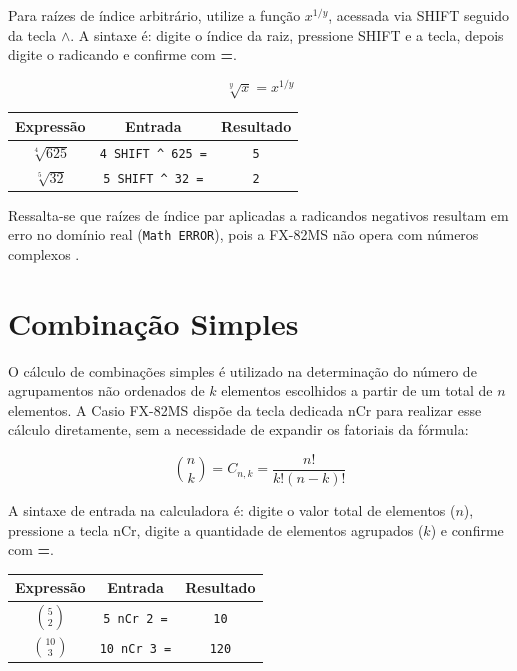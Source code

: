 Para raízes de índice arbitrário, utilize a função \textbf{$x^{1/y}$}, acessada via SHIFT seguido da tecla \textbf{$\wedge$}. A sintaxe é: digite o índice da raiz, pressione SHIFT e a tecla, depois digite o radicando e confirme com \textbf{=}.

\[
    \sqrt[y]{x} = x^{1/y}
\]

\begin{center}
\begin{tabular}{|c|c|c|}
    \hline
    \textbf{Expressão} & \textbf{Entrada} & \textbf{Resultado} \\
    \hline
    $\sqrt[4]{625}$ & \texttt{4 SHIFT \^{} 625 =} & \texttt{5} \\
    $\sqrt[5]{32}$ & \texttt{5 SHIFT \^{} 32 =} & \texttt{2} \\
    \hline
\end{tabular}
\end{center}

Ressalta-se que raízes de índice par aplicadas a radicandos negativos 
resultam em erro no domínio real (\texttt{Math ERROR}), pois a FX-82MS 
não opera com números complexos \cite{casio2004}.

\section{Combinação Simples}

O cálculo de combinações simples é utilizado na determinação do número de agrupamentos não ordenados de $k$ elementos escolhidos a partir de um total de $n$ elementos. A Casio FX-82MS dispõe da tecla dedicada nCr para realizar esse cálculo diretamente, sem a necessidade de expandir os fatoriais da fórmula:

\[
    \binom{n}{k} = C_{n,k} = \frac{n!}{k!(n-k)!}
\]

A sintaxe de entrada na calculadora é: digite o valor total de elementos ($n$), pressione a tecla nCr, digite a quantidade de elementos agrupados ($k$) e confirme com \textbf{=}.

\begin{center}
\begin{tabular}{|c|c|c|}
    \hline
    \textbf{Expressão} & \textbf{Entrada} & \textbf{Resultado} \\
    \hline
    $\binom{5}{2}$ & \texttt{5 nCr 2 =} & \texttt{10} \\
    $\binom{10}{3}$ & \texttt{10 nCr 3 =} & \texttt{120} \\
    \hline
\end{tabular}
\end{center}

